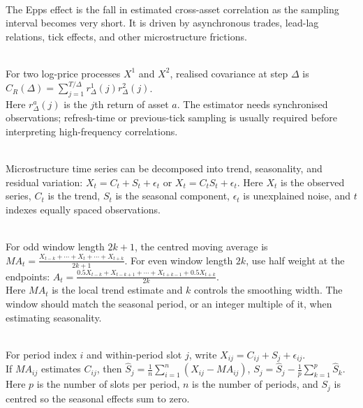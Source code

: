 \documentclass[a4paper,oneside,openany]{book}
\begin{document}
\begin{definition} \\
The Epps effect is the fall in estimated cross-asset correlation as the sampling interval becomes very short. It is driven by asynchronous trades, lead-lag relations, tick effects, and other microstructure frictions.
\end{definition}

\begin{model} \\
For two log-price processes $X^1$ and $X^2$, realised covariance at step $\Delta$ is $\hat{C}_R(\Delta)=\sum\limits_{j=1}^{T/\Delta}r_\Delta^1(j)r_\Delta^2(j)$.\\
Here $r_\Delta^a(j)$ is the $j$th return of asset $a$. The estimator needs synchronised observations; refresh-time or previous-tick sampling is usually required before interpreting high-frequency correlations.
\end{model}

\begin{model} \\
Microstructure time series can be decomposed into trend, seasonality, and residual variation: $X_t=C_t+S_t+\epsilon_t$ or $X_t=C_tS_t+\epsilon_t$. Here $X_t$ is the observed series, $C_t$ is the trend, $S_t$ is the seasonal component, $\epsilon_t$ is unexplained noise, and $t$ indexes equally spaced observations.
\end{model}

\begin{definition} \\
For odd window length $2k+1$, the centred moving average is $MA_t=\frac{X_{t-k}+\cdots+X_t+\cdots+X_{t+k}}{2k+1}$. For even window length $2k$, use half weight at the endpoints: $A_t=\frac{0.5X_{t-k}+X_{t-k+1}+\cdots+X_{t+k-1}+0.5X_{t+k}}{2k}$.\\
Here $MA_t$ is the local trend estimate and $k$ controls the smoothing width. The window should match the seasonal period, or an integer multiple of it, when estimating seasonality.
\end{definition}

\begin{model} \\
For period index $i$ and within-period slot $j$, write $X_{ij}=C_{ij}+S_j+\epsilon_{ij}$.\\
If $MA_{ij}$ estimates $C_{ij}$, then $\hat{S}_j=\frac{1}{n}\sum_{i=1}^{n}(X_{ij}-MA_{ij})$, $S_j=\hat{S}_j-\frac{1}{p}\sum_{k=1}^{p}\hat{S}_k$. Here $p$ is the number of slots per period, $n$ is the number of periods, and $S_j$ is centred so the seasonal effects sum to zero.
\end{model}
\end{document}
